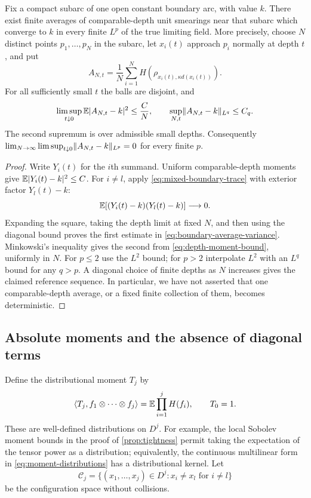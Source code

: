 \begin{lemma}
\label{lem:boundary-references}
Fix a compact subarc of one open constant boundary arc, with value
$k$. There exist finite averages of comparable-depth unit smearings
near that subarc which converge to $k$ in every finite $L^p$ of the
true limiting field. More precisely, choose $N$ distinct points
$p_1,\ldots,p_N$ in the subarc, let $x_i(t)$ approach $p_i$ normally
at depth $t$, and put
\[
 A_{N,t}=\frac1N\sum_{i=1}^N
       H(\rho_{x_i(t),\kappa d(x_i(t))}).
\]
For all sufficiently small $t$ the balls are disjoint, and
\begin{equation}
 \limsup_{t\downarrow0}\mathbb E|A_{N,t}-k|^2\le\frac C N,
 \qquad
 \sup_{N,t}\lVert A_{N,t}-k\rVert_{L^q}\le C_q.
 \label{eq:boundary-average-variance}
\end{equation}
The second supremum is over admissible small depths. Consequently
$\lim_{N\to\infty}\limsup_{t\downarrow0}
\lVert A_{N,t}-k\rVert_{L^p}=0$ for every finite $p$.
\end{lemma}

\begin{proof}
Write $Y_i(t)$ for the $i$th summand. Uniform comparable-depth
moments give $\mathbb E|Y_i(t)-k|^2\le C$. For $i\ne l$, apply
\eqref{eq:mixed-boundary-trace} with exterior factor $Y_l(t)-k$:
\[
       \mathbb E[(Y_i(t)-k)(Y_l(t)-k)]\longrightarrow0.
\]
Expanding the square, taking the depth limit at fixed $N$, and then
using the diagonal bound proves the first estimate in
\eqref{eq:boundary-average-variance}. Minkowski's inequality gives
the second from \eqref{eq:depth-moment-bound}, uniformly in $N$.
For $p\le2$ use the $L^2$ bound; for $p>2$ interpolate $L^2$ with
an $L^q$ bound for any $q>p$. A diagonal choice of finite depths as
$N$ increases gives the claimed reference sequence. In particular,
we have not asserted that one comparable-depth average, or a fixed
finite collection of them, becomes deterministic.
\end{proof}

\subsection{Absolute moments and the absence of diagonal terms}

Define the distributional moment $T_j$ by
\begin{equation}
 \langle T_j,f_1\otimes\cdots\otimes f_j\rangle
       =\mathbb E\prod_{i=1}^j H(f_i),\qquad T_0=1.
 \label{eq:moment-distributions}
\end{equation}
These are well-defined distributions on $D^j$. For example, the
local Sobolev moment bounds in the proof of \cref{prop:tightness}
permit taking the expectation of the tensor power as a distribution;
equivalently, the continuous multilinear form in
\eqref{eq:moment-distributions} has a distributional kernel. Let
\[
 \mathcal C_j=\{(x_1,\ldots,x_j)\in D^j:x_i\ne x_l\text{ for }i\ne l\}
\]
be the configuration space without collisions.

